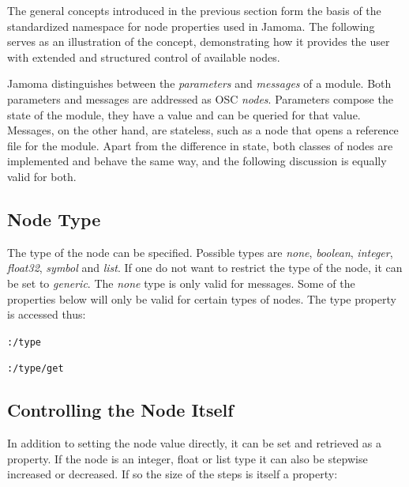 \documentclass{NIME-alternate}
\begin{document}
The general concepts introduced in the previous section form the basis of the standardized namespace for node properties used in Jamoma. The following serves as an illustration of the concept, demonstrating how it provides the user with extended and structured control of available nodes.

Jamoma distinguishes between the \emph{parameters} and \emph{messages} of a module.  Both parameters and messages are addressed as OSC \emph{nodes}.  Parameters compose the state of the module, they have a value and can be queried for that value. Messages, on the other hand, are stateless, such as a node that opens a reference file for the module. Apart from the difference in state, both classes of nodes are implemented and behave the same way, and the following discussion is equally valid for both. 




\subsection{Node Type} %
\label{sub:type}

The type of the node can be specified. Possible types are \emph{none}, \emph{boolean}, \emph{integer}, \emph{float32}, \emph{symbol} and \emph{list}. If one do not want to restrict the type of the node, it can be set to \emph{generic}. The \emph{none} type is only valid for messages. Some of the properties below will only be valid for certain types of nodes. The type property is accessed thus:

\texttt{:/type}

\texttt{:/type/get}





\subsection{Controlling the Node Itself} %
\label{sub:controlling_the_node_itself}

In addition to setting the node value directly, it can be set and retrieved as a property. If the node is an integer, float or list type it can also be stepwise increased or decreased. If so the size of the steps is itself a property:
\end{document}
